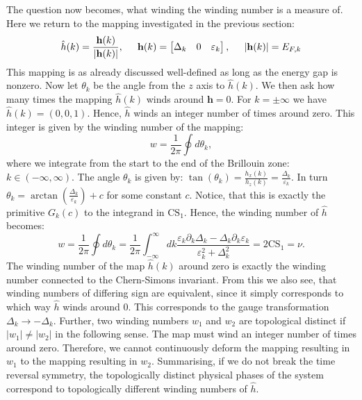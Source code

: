 The question now becomes, what winding the winding number is a measure of. Here we return to the mapping investigated in the previous section: 
\begin{equation}
\hat{h}(k) = \frac{\mathbf{h}(k)}{|\mathbf{h}(k)|}, \hspace{0.5cm} \mathbf{h}(k) = \begin{bmatrix} \Delta_k & 0 & \varepsilon_k \end{bmatrix}, \hspace{0.5cm}  |\mathbf{h}(k)| = E_{F,k} \nonumber
\end{equation}
This mapping is as already discussed well-defined as long as the energy gap is nonzero. Now let $\theta_k$ be the angle from the $z$ axis to $\hat{h}(k)$. We then ask how many times the mapping $\hat{h}(k)$ winds around $\mathbf{h} = 0$. For $k = \pm \infty$ we have $\hat{h}(k) = (0, 0, 1)$. Hence, $\hat{h}$ winds an integer number of times around zero. This integer is given by the winding number of the mapping:
\begin{equation}
w = \frac{1}{2\pi}\oint d\theta_k, \nonumber
\end{equation}  
where we integrate from the start to the end of the Brillouin zone: $k \in (-\infty, \infty)$. The angle $\theta_k$ is given by: $\tan(\theta_k) = \frac{h_x(k)}{h_z(k)} = \frac{\Delta_k}{\varepsilon_k}$. In turn $\theta_k = \arctan\left(\frac{\Delta_k}{\varepsilon_k}\right) + c$ for some constant $c$. Notice, that this is exactly the primitive $G_k(c)$ to the integrand in $\text{CS}_1$. Hence, the winding number of $\hat{h}$ becomes:
\begin{equation}
w = \frac{1}{2\pi}\oint d\theta_k = \frac{1}{2\pi}\int_{-\infty}^{\infty} dk \frac{\varepsilon_k\partial_k\Delta_k - \Delta_k\partial_k\varepsilon_k}{\varepsilon^2_k + \Delta^2_k} = 2\text{CS}_1 = \nu. \nonumber
\end{equation}
The winding number of the map $\hat{h}(k)$ around zero is exactly the winding number connected to the Chern-Simons invariant. From this we also see, that winding numbers of differing sign are equivalent, since it simply corresponds to which way $\hat{h}$ winds around $0$. This corresponds to the gauge transformation $\Delta_k \to - \Delta_k$. Further, two winding numbers $w_1$ and $w_2$ are topological distinct if $|w_1|\neq |w_2|$ in the following sense. The map must wind an integer number of times around zero. Therefore, we cannot continuously deform the mapping resulting in $w_1$ to the mapping resulting in $w_2$. Summarising, if we do not break the time reversal symmetry, the topologically distinct physical phases of the system correspond to topologically different winding numbers of $\hat{h}$.

